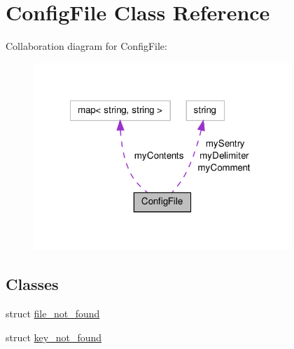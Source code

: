 \hypertarget{classConfigFile}{\section{Config\-File Class Reference}
\label{classConfigFile}
}


Collaboration diagram for Config\-File\-:\nopagebreak
\begin{figure}[H]
\begin{center}
\leavevmode
\includegraphics[width=273pt]{classConfigFile__coll__graph}
\end{center}
\end{figure}
\subsection*{Classes}
\begin{DoxyCompactItemize}
\item 
struct \hyperlink{structConfigFile_1_1file__not__found}{file\-\_\-not\-\_\-found}
\item 
struct \hyperlink{structConfigFile_1_1key__not__found}{key\-\_\-not\-\_\-found}
\end{DoxyCompactItemize}
